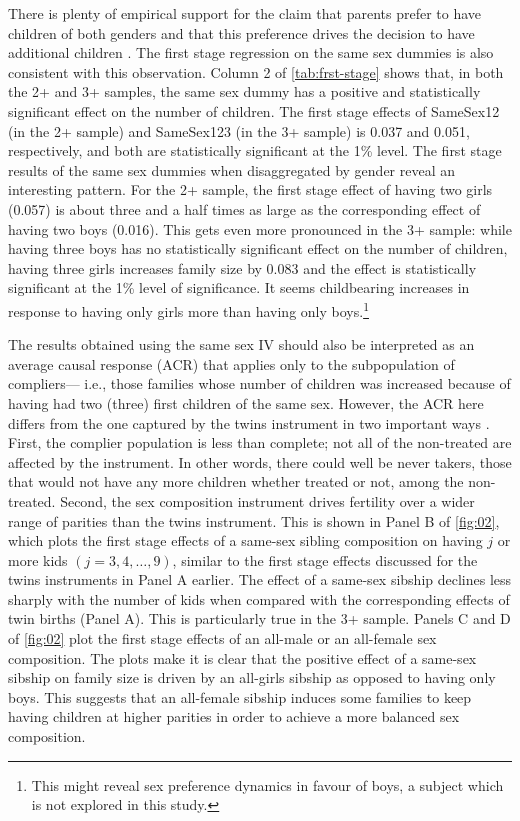 There is plenty of empirical support for the claim that parents prefer to have children of both genders and that this preference drives the decision to have additional children \parencite[e.g.,][]{norling_measuring_2018,bisbee_local_2015}. The first stage regression on the same sex dummies is also consistent with this observation. Column 2 of \autoref{tab:frst-stage} shows that, in both the 2+ and 3+ samples, the same sex dummy has a positive and statistically significant effect on the number of children.  The first stage effects of SameSex12 (in the 2+ sample) and SameSex123 (in the 3+ sample) is 0.037 and 0.051, respectively, and both are statistically significant at the 1\% level. The first stage results of the same sex dummies when disaggregated by gender reveal an interesting pattern. For the 2+ sample, the first stage effect of having two girls (0.057) is about three and a half times as large as the corresponding effect of having two boys (0.016). This gets even more pronounced in the 3+ sample: while having three boys has no statistically significant effect on the number of children, having three girls increases family size by 0.083 and the effect is statistically significant at the 1\% level of significance. It seems childbearing increases in response to having only girls more than having only boys.\footnote{ This might reveal sex preference dynamics in favour of boys, a subject which is not explored in this study. } 

The results obtained using the same sex IV should also be interpreted as an average causal response (ACR) that applies only to the subpopulation of compliers--- i.e., those families whose number of children was increased because of having had two (three) first children of the same sex. However, the ACR here differs from the one captured by the twins instrument in two important ways \parencite{angrist_multiple_2010}. First, the complier population is less than complete; not all of the non-treated are affected by the instrument. In other words, there could well be never takers, those that would not have any more children whether treated or not, among the non-treated. Second, the sex composition instrument drives fertility over a wider range of parities than the twins instrument. This is shown in Panel B of \autoref{fig:02}, which plots the first stage effects of a same-sex sibling composition on having $ j $ or more kids $ (j = 3, 4, \dots, 9) $, similar to the first stage effects discussed for the twins instruments in Panel A earlier. The effect of a same-sex sibship declines less sharply with the number of kids when compared with the corresponding effects of twin births (Panel A). This is particularly true in the 3+ sample. Panels C and D of \autoref{fig:02} plot the first stage effects of an all-male or an all-female sex composition. The plots make it is clear that the positive effect of a same-sex sibship on family size is driven by an all-girls sibship as opposed to having only boys. This suggests that an all-female sibship induces some families to keep having children at higher parities in order to achieve a more balanced sex composition. 

